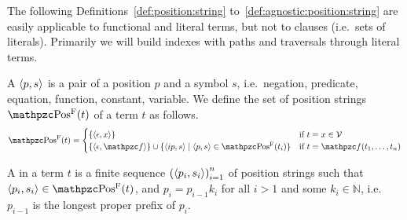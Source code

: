 	\begin{remark}
		The following Definitions~\ref{def:position:string} to~\ref{def:agnostic:position:string}
		are easily applicable to functional and literal terms, but not to clauses (i.e.\ sets of literals).
		Primarily we will build indexes with paths and traversals through literal terms.
	\end{remark}

	\begin{definition}\label{def:position:string}
		A  \( \langle p, s \rangle \)
		is a pair of a position \( p \) and a symbol \( s \),
		i.e.~negation, predicate, equation, function, constant, variable.
%
		We define the set of position strings \(\PosStr(t)\)
		of a term \( t \) as follows.
		\begin{gather*}
		\PosStr(t) =
		\begin{cases}
		\{ \ANGLES{\epsilon,x} \}
		& \text{if }t=x\in\SIGV \\
		\{ \ANGLES{\epsilon, \mcf} \} \cup \{ \ANGLES{ip,s}\mid \ANGLES{p,s} \in\PosStr(t_i)\}
		&\text{if }t=\mcf(t_1,\ldots,t_n)
		\end{cases}
		\end{gather*}
	\end{definition}



	\begin{definition}\label{def:term:path}
		A  in a term \( t \)
		is a finite sequence
		\( {( \langle p_i,s_i\rangle )}^{n}_{i=1}
			\)
		of position strings such that
		\( \ANGLES{p_i,s_i} \in \PosStr(t) \),
		and \( p_i = p_{i-1} k_i \)
		for all \( i > 1 \)
		and some \( k_i \in\mathbb{N} \),
		i.e.~\(p_{i-1}\) is the longest proper prefix of \(p_{i}\).


	\end{definition}

